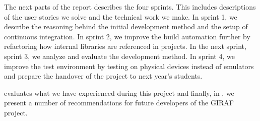 The next parts of the report describes the four sprints. This includes descriptions of the user stories we solve and the technical work we make. In sprint 1, we describe the reasoning behind the initial development method and the setup of continuous integration. In sprint 2, we improve the build automation further by refactoring how internal libraries are referenced in projects. In the next sprint, sprint 3, we analyze and evaluate the development method. In sprint 4, we improve the test environment by testing on physical devices instead of emulators  and prepare the handover of the project to next year's students.

 evaluates what we have experienced during this project and finally, in , we present a number of recommendations for future developers of the GIRAF project.